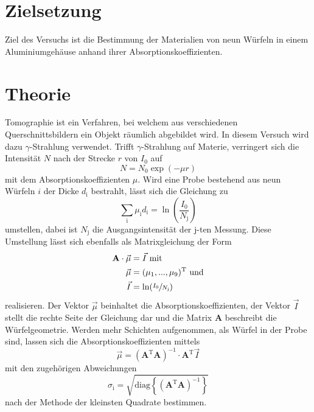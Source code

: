 \section{Zielsetzung}
\label{sec:Zielsetzung}

Ziel des Versuchs ist die Bestimmung der Materialien von neun Würfeln in einem
Aluminiumgehäuse anhand ihrer Absorptionskoeffizienten.

\section{Theorie}
\label{sec:Theorie}

Tomographie ist ein Verfahren, bei welchem aus verschiedenen
Querschnittsbildern ein Objekt räumlich abgebildet wird. In diesem Versuch
wird dazu $\gamma$-Strahlung verwendet.
Trifft $\gamma$-Strahlung auf Materie, verringert sich die Intensität $N$
nach der Strecke $r$ von $I_0$ auf
\begin{equation*}
  N = N_0 \exp\left(-\mu r\right)
\end{equation*}
mit dem Absorptionskoeffizienten $\mu$. Wird eine Probe bestehend aus
neun Würfeln $i$ der Dicke $d_\text{i}$ bestrahlt, lässt sich
die Gleichung zu
\begin{equation*}
  \sum_\text{i} \mu_\text{i} d_\text{i} = \ln\left(\frac{I_0}{N_\text{j}}\right)
\end{equation*}
umstellen, dabei ist $N_\text{j}$ die Ausgangsintensität der j-ten Messung.
Diese Umstellung lässt sich ebenfalls als Matrixgleichung der
Form
\begin{equation}
  \begin{aligned}
    \mathbf{A} \cdot \vec{\mu} &= \vec{I} \text{ mit} \\
    \vec{\mu} &= (\mu_1,...,\mu_9)^\text{T} \text{ und} \\
    \vec{I} &= \ln(\sfrac{I_0}{N_\text{j}})
  \end{aligned}
  \label{eqn:matrixform}
\end{equation}
realisieren.
Der Vektor $\vec{\mu}$ beinhaltet die
Absorptionskoeffizienten,
der Vektor $\vec{I}$ stellt die rechte Seite
der Gleichung dar und die Matrix $\mathbf{A}$ beschreibt die Würfelgeometrie.
Werden mehr Schichten aufgenommen, als Würfel in der Probe sind, lassen sich
die Absorptionskoeffizienten mittels
\begin{equation}
  \vec{\mu} = \left(\mathbf{A}^\text{T} \mathbf{A}\right)^{-1} \cdot
  \mathbf{A}^\text{T} \vec{I}
  \label{eqn:least-squares}
\end{equation}
mit den zugehörigen Abweichungen
\begin{equation}
  \sigma_\text{i} =
  \sqrt{\text{diag}\left\{\left(\mathbf{A}^\text{T} \mathbf{A}\right)^{-1}\right\}}
  \label{eqn:least-squares-error}
\end{equation}
nach der Methode der kleinsten Quadrate bestimmen.

